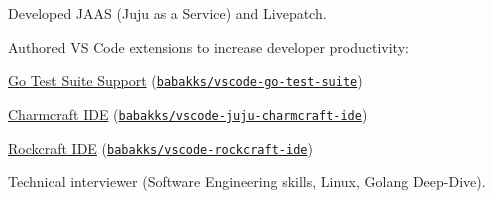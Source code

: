 \documentclass[9pt,a4paper]{extarticle}
\begin{document}


\begin{customitemize}
    \item {}
    \begin{customitemize}
        \item {}
        \begin{customitemize}
            \item[] {}
            \item{Developed JAAS (Juju as a Service) and Livepatch.}
            \item{Authored VS Code extensions to increase developer productivity:}
            \begin{customitemize}
                \item{\href{https://marketplace.visualstudio.com/items?itemName=babakks.vscode-go-test-suite}{Go Test Suite Support} (\href{https://github.com/babakks/vscode-go-test-suite}{\texttt{babakks/vscode-go-test-suite}})}
                \item{\href{https://marketplace.visualstudio.com/items?itemName=babakks.vscode-juju-charmcraft-ide}{Charmcraft IDE} (\href{https://github.com/babakks/vscode-juju-charmcraft-ide}{\texttt{babakks/vscode-juju-charmcraft-ide}})}
                \item{\href{https://marketplace.visualstudio.com/items?itemName=babakks.vscode-rockcraft-ide}{Rockcraft IDE} (\href{https://github.com/babakks/vscode-rockcraft-ide}{\texttt{babakks/vscode-rockcraft-ide}})}
            \end{customitemize}
            \item{Technical interviewer (Software Engineering skills, Linux, Golang Deep-Dive).}
        \end{customitemize}
    \end{customitemize}


\end{customitemize}
\end{document}
